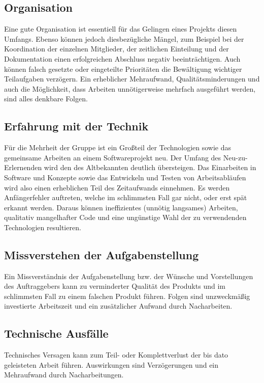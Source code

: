 \subsection{Organisation}\label{r6}
  Eine gute Organisation ist essentiell für das Gelingen eines Projekts diesen Umfangs. Ebenso können jedoch diesbezügliche Mängel, zum Beispiel bei der Koordination der einzelnen Mitglieder, der zeitlichen Einteilung und der Dokumentation einen erfolgreichen Abschluss negativ beeinträchtigen. Auch können falsch gesetzte oder eingeteilte Prioritäten die Bewältigung wichtiger Teilaufgaben verzögern. Ein erheblicher Mehraufwand, Qualitätsminderungen und auch die Möglichkeit, dass Arbeiten unnötigerweise mehrfach ausgeführt werden, sind alles denkbare Folgen. 
  


\subsection{Erfahrung mit der Technik}\label{r7}
  Für die Mehrheit der Gruppe ist ein Großteil der Technologien sowie das gemeinsame Arbeiten an einem Softwareprojekt neu. Der Umfang des {\glqq}Neu-zu-Erlernenden{\grqq} wird den des {\glqq}Altbekannten{\grqq} deutlich übersteigen.
  Das Einarbeiten in Software und Konzepte sowie das Entwickeln und Testen von Arbeitsabläufen wird also einen erheblichen Teil des Zeitaufwands einnehmen.
  Es werden Anfängerfehler auftreten, welche im schlimmsten Fall gar nicht, oder erst spät erkannt werden.
  Daraus können ineffizientes (unnötig langsames) Arbeiten, qualitativ mangelhafter Code und eine ungünstige Wahl der zu verwendenden Technologien resultieren.
  


\subsection{Missverstehen der Aufgabenstellung}\label{r8}
  Ein Missverständnis der Aufgabenstellung bzw. der Wünsche und Vorstellungen des Auftraggebers kann zu verminderter Qualität des Produkts und im schlimmsten Fall zu einem falschen Produkt führen. Folgen sind unzweckmäßig investierte Arbeitszeit und ein zusätzlicher Aufwand durch Nacharbeiten.


\subsection{Technische Ausfälle}\label{r9}
  Technisches Versagen kann zum Teil- oder Komplettverlust der bis dato geleisteten Arbeit führen. Auswirkungen sind Verzögerungen und ein Mehraufwand durch Nacharbeitungen.

